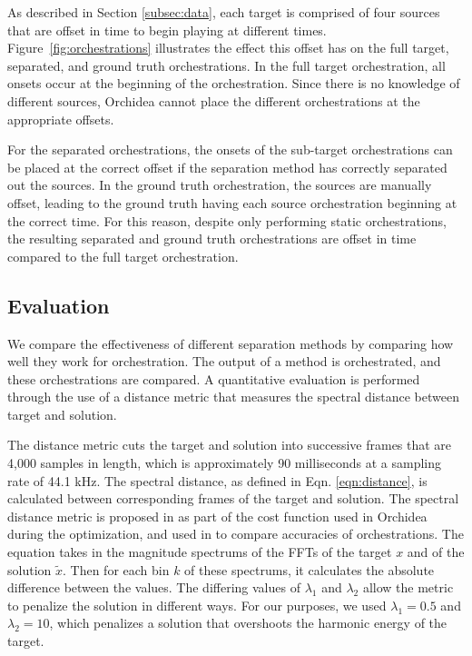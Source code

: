 \documentclass{article}
\begin{document}
    As described in Section \ref{subsec:data}, each target is comprised of four sources that are offset in time to begin playing at different times. Figure~\ref{fig:orchestrations} illustrates the effect this offset has on the full target, separated, and ground truth orchestrations. In the full target orchestration, all onsets occur at the beginning of the orchestration. Since there is no knowledge of different sources, Orchidea cannot place the different orchestrations at the appropriate offsets. 
    
    For the separated orchestrations, the onsets of the sub-target orchestrations can be placed at the correct offset if the separation method has correctly separated out the sources. In the ground truth orchestration, the sources are manually offset, leading to the ground truth having each source orchestration beginning at the correct time. For this reason, despite only performing static orchestrations, the resulting separated and ground truth orchestrations are offset in time compared to the full target orchestration.
    
    \subsection{Evaluation}
    We compare the effectiveness of different separation methods by comparing how well they work for orchestration. The output of a method is orchestrated, and these orchestrations are compared. A quantitative evaluation is performed through the use of a distance metric that measures the spectral distance between target and solution. 
    
    The distance metric cuts the target and solution into successive frames that are 4,000 samples in length, which is approximately 90 milliseconds at a sampling rate of 44.1 kHz. The spectral distance, as defined in Eqn. \ref{eqn:distance}, is calculated between corresponding frames of the target and solution. The spectral distance metric is proposed in \cite{Cella2020} as part of the cost function used in Orchidea during the optimization, and used in \cite{Cella2020b} to compare accuracies of orchestrations. The equation takes in the magnitude spectrums of the FFTs of the target $x$ and of the solution $\tilde{x}$. Then for each bin $k$ of these spectrums, it calculates the absolute difference between the values. The differing values of $\lambda_1$ and $\lambda_2$ allow the metric to penalize the solution in different ways. For our purposes, we used $\lambda_1 = 0.5$ and $\lambda_2 = 10$, which penalizes a solution that overshoots the harmonic energy of the target.
    
\end{document}
